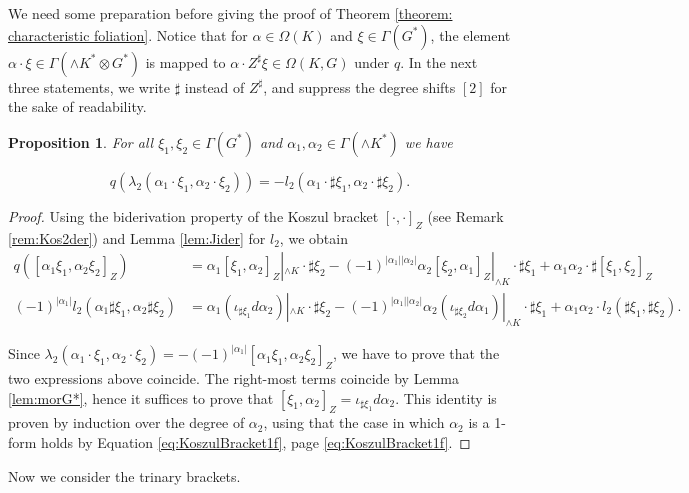 \documentclass[11pt,thmsa]{amsart}
\newtheorem{proposition}[theorem]{Proposition}
\theoremstyle{definition}
\begin{document}
We need some preparation before giving the proof of Theorem \ref{theorem: characteristic foliation}. Notice that for $\alpha \in \Omega(K)$ and $\xi\in \Gamma(G^*)$,
the element $\alpha \cdot  \xi\in \Gamma(\wedge K^*\otimes G^*)$ is mapped to $\alpha \cdot Z^{\sharp} \xi\in \Omega(K,G)$ under $q$. In the next three statements, we write $\sharp$ instead of $Z^{\sharp}$,
and suppress the degree shifts $[2]$ for the sake of readability.


\begin{proposition}\label{prop:intertwo}
 For all $\xi_1,\xi_2\in \Gamma(G^*)$ and $\alpha_1,\alpha_2\in \Gamma(\wedge K^*)$ we have
  
$$q\left(\lambda_2 (\alpha_1\cdot\xi_1,\alpha_2\cdot\xi_2)\right)=-l_2(\alpha_1 \cdot\sharp \xi_1,\alpha_2 \cdot\sharp \xi_2).$$

\end{proposition}
\begin{proof}
Using the biderivation property of the Koszul bracket $[\cdot,\cdot]_Z$ (see Remark \ref{rem:Kos2der}) and Lemma \ref{lem:Jider} for $l_2$, we obtain
\begin{align*}
q([\alpha_1\xi_1,\alpha_2\xi_2]_Z)&=\alpha_1[ \xi_1,\alpha_2]_Z|_{\wedge K}\cdot \sharp \xi_2
-(-1)^{|\alpha_1||\alpha_2|}\alpha_2[ \xi_2,\alpha_1]_Z|_{\wedge K}\cdot \sharp \xi_1
+\alpha_1\alpha_2\cdot \sharp [\xi_1,\xi_2]_Z\\
(-1)^{|\alpha_1|}l_2(\alpha_1\sharp \xi_1,\alpha_2 \sharp \xi_2)&=\alpha_1(\iota_{\sharp \xi_1} d\alpha_2)|_{\wedge K}\cdot \sharp \xi_2
-(-1)^{|\alpha_1||\alpha_2|}\alpha_2(\iota_{\sharp \xi_2} d\alpha_1)|_{\wedge K}\cdot \sharp \xi_1
+\alpha_1\alpha_2 \cdot l_2(\sharp \xi_1,\sharp \xi_2).
\end{align*}

Since $\lambda_2 (\alpha_1\cdot\xi_1,\alpha_2\cdot\xi_2)=-(-1)^{|\alpha_1|}[\alpha_1\xi_1,\alpha_2\xi_2]_Z$, we have to prove that the two expressions above coincide.
 The right-most terms coincide by Lemma \ref{lem:morG*}, hence it suffices to prove that 
$[ \xi_1,\alpha_2]_Z=\iota_{\sharp \xi_1} d\alpha_2$. This identity is proven by induction over the degree of $\alpha_2$, using that the case in which  $\alpha_2$ is a 1-form   holds by Equation \eqref{eq:KoszulBracket1f}, page \ref{eq:KoszulBracket1f}.\end{proof}

 Now we consider the trinary brackets. 
\end{document}
